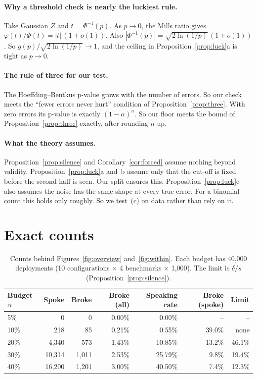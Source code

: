\documentclass[11pt]{article}
\theoremstyle{plain}
\theoremstyle{definition}
\begin{document}
\paragraph{Why a threshold check is nearly the luckiest rule.} Take Gaussian $Z$ and $t = \Phi^{-1}(p)$. As $p \to 0$, the Mills ratio gives $\varphi(t)/\Phi(t) = |t|\,(1 + o(1))$. Also $|\Phi^{-1}(p)| = \sqrt{2\ln(1/p)}\,(1 + o(1))$. So $g(p) / \sqrt{2\ln(1/p)} \to 1$, and the ceiling in Proposition~\ref{prop:luck}a is tight as $p \to 0$.

\paragraph{The rule of three for our test.} The Hoeffding--Bentkus p-value grows with the number of errors. So our check meets the ``fewer errors never hurt'' condition of Proposition~\ref{prop:three}. With zero errors its p-value is exactly $(1-\alpha)^n$. So our floor meets the bound of Proposition~\ref{prop:three} exactly, after rounding $n$ up.

\paragraph{What the theory assumes.} Proposition~\ref{prop:silence} and Corollary~\ref{cor:forced} assume nothing beyond validity. Proposition~\ref{prop:luck}a and~b assume only that the cut-off is fixed before the second half is seen. Our split ensures this. Proposition~\ref{prop:luck}c also assumes the noise has the same shape at every true error. For a binomial count this holds only roughly. So we test~(c) on data rather than rely on it.

\section{Exact counts}
\label{app:counts}

\begin{table}[H]
\centering
\small
\caption{Counts behind Figures~\ref{fig:overview} and~\ref{fig:within}. Each budget has 40{,}000 deployments (10 configurations $\times$ 4 benchmarks $\times$ 1{,}000). The limit is $\delta/s$ (Proposition~\ref{prop:silence}).}
\label{tab:counts}
\begin{tabular}{lrrrrrr}
\toprule
Budget $\alpha$ & Spoke & Broke & Broke (all) & Speaking rate & Broke (spoke) & Limit \\
\midrule
5\%  & 0      & 0     & 0.00\% & 0.00\%  & --      & --      \\
10\% & 218    & 85    & 0.21\% & 0.55\%  & 39.0\%  & none    \\
20\% & 4{,}340  & 573   & 1.43\% & 10.85\% & 13.2\%  & 46.1\%  \\
30\% & 10{,}314 & 1{,}011 & 2.53\% & 25.79\% & 9.8\%   & 19.4\%  \\
40\% & 16{,}200 & 1{,}201 & 3.00\% & 40.50\% & 7.4\%   & 12.3\%  \\
\bottomrule
\end{tabular}
\end{table}
\end{document}
